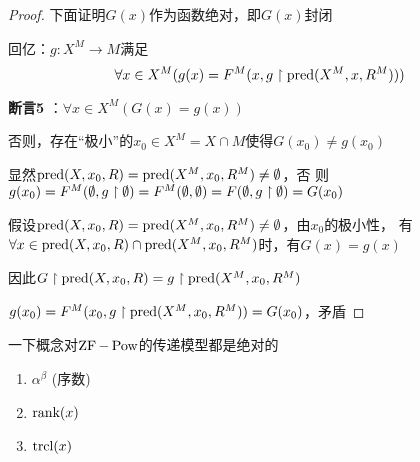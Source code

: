 \documentclass[11pt]{article}
\begin{document}
\begin{proof}
下面证明\(G(x)\)作为函数绝对，即\(G(x)\)封闭

回亿：\(g:X^M\to M\)满足
\begin{equation*}
\forall x\in X^M(g(x)=F^M(x,g\upharpoonright\text{pred}(X^M,x,R^M)))
\end{equation*}

\textbf{断言5} ：\(\forall x\in X^M(G(x)=g(x))\)

否则，存在“极小”的\(x_0\in X^M=X\cap M\)使得\(G(x_0)\neq g(x_0)\)

显然\(\text{pred}(X,x_0,R)=\text{pred}(X^M,x_0,R^M)\neq\emptyset\)，否
则\(g(x_0)=F^M(\emptyset,g\upharpoonright\emptyset)=F^M(\emptyset,\emptyset)=F(\emptyset,g\upharpoonright\emptyset)=G(x_0)\)

假设\(\text{pred}(X,x_0,R)=\text{pred}(X^M,x_0,R^M)\neq\emptyset\)，由\(x_0\)的极小性，
有\(\forall x\in\text{pred}(X,x_0,R)\cap\text{pred}(X^M,x_0,R^M)\)时，有\(G(x)=g(x)\)

因此\(G\upharpoonright\text{pred}(X,x_0,R)=g\upharpoonright\text{pred}(X^M,x_0,R^M)\)

\(g(x_0)=F^M(x_0,g\upharpoonright\text{pred}(X^M,x_0,R^M))=G(x_0)\)，矛盾
\end{proof}

\begin{theorem}[]
一下概念对\(\operatorname{ZF}-\operatorname{Pow}\)的传递模型都是绝对的
\begin{enumerate}
\item \(\alpha^\beta\) (序数)
\item \(\text{rank}(x)\)
\item \(\operatorname{\text{trcl}}(x)\)
\end{enumerate}
\end{theorem}
\end{document}
